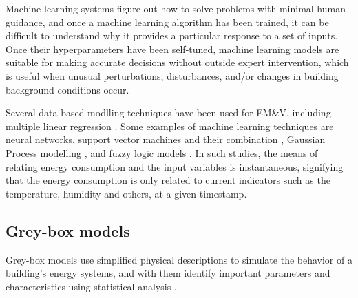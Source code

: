 \documentclass[10pt, conference, compsocconf]{IEEEtran}
\begin{document}


Machine learning systems figure out how to solve problems with minimal human guidance, and once a machine learning algorithm has been trained, it can be difficult to understand why it provides a particular response to a set of inputs. 
Once their hyperparameters have been self-tuned, machine learning models are suitable for making accurate decisions without outside expert intervention, which is useful when unusual perturbations, disturbances, and/or changes in building background conditions occur. 

Several data-based modlling techniques have been used for EM\&V, including multiple linear regression \cite{braun2014using}.  %
Some examples of machine learning techniques are neural networks, support vector machines and their combination \cite{ahmad2014review}, Gaussian Process modelling \cite{heo2012gaussian}, and fuzzy logic models \cite{ciabattoni2014fuzzy}. In such studies, the means of relating energy consumption and the input variables is instantaneous, signifying that the energy consumption is only related to current indicators such as the temperature, humidity and others, at a given timestamp.
  

\subsection{Grey-box models}

Grey-box models use simplified physical descriptions to simulate the behavior of a building's energy systems, and with them identify important parameters and characteristics using statistical analysis \cite{handbook2017american}.
\end{document}
